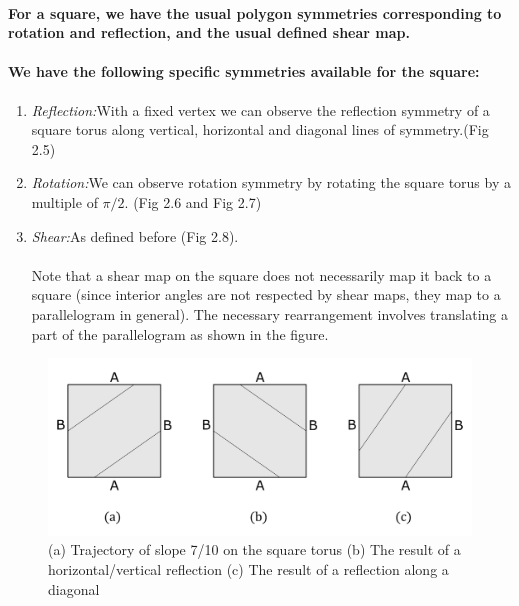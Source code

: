 \documentclass{report}
\begin{document}
\paragraph{For a square, we have the usual polygon symmetries corresponding to rotation and reflection, and the usual defined shear map.}

\paragraph{We have the following specific symmetries available for the square:}

\begin{enumerate}
\item  {\emph{Reflection:}With a fixed vertex we can observe the reflection symmetry of a square torus along vertical, horizontal and diagonal lines of symmetry.(Fig 2.5) }


\item  {\emph{Rotation:}We can observe rotation symmetry by rotating the square torus by a multiple of $\pi/2$. (Fig 2.6 and Fig 2.7)}

\item  {\emph{Shear:}As defined before (Fig 2.8). \\  \\ Note that a shear map on the square does not necessarily map it back to a square (since interior angles are not respected by shear maps, they map to a parallelogram in general). The necessary rearrangement involves translating a part of the parallelogram as shown in the figure. }

\end{enumerate}


\begin{figure} 
\begin{center}
\includegraphics[scale=0.3]{2.5}
\caption{(a) Trajectory of slope 7/10 on the square torus (b) The result of a horizontal/vertical reflection (c) The result of a reflection along a diagonal}
\end{center}
\end{figure}
\end{document}
